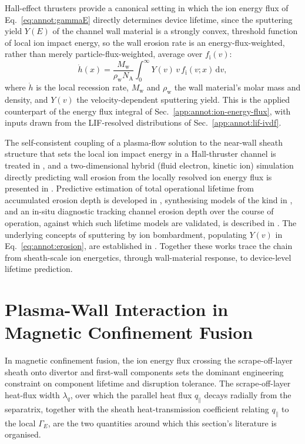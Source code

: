 Hall-effect thrusters provide a canonical setting in which the ion energy flux of Eq.~\eqref{eq:annot:gammaE} directly determines device lifetime, since the sputtering yield $Y(E)$ of the channel wall material is a strongly convex, threshold function of local ion impact energy, so the wall erosion rate is an energy-flux-weighted, rather than merely particle-flux-weighted, average over $f_{\mathrm{i}}(v)$:
\begin{equation}
\dot{h}(x) = \frac{M_{\mathrm{w}}}{\rho_{\mathrm{w}} N_{\mathrm{A}}} \int_{0}^{\infty} Y(v)\, v\, f_{\mathrm{i}}(v;x)\, \mathrm{d}v,
\label{eq:annot:erosion}
\end{equation}
where $\dot{h}$ is the local recession rate, $M_{\mathrm{w}}$ and $\rho_{\mathrm{w}}$ the wall material's molar mass and density, and $Y(v)$ the velocity-dependent sputtering yield. This is the applied counterpart of the energy flux integral of Sec.~\ref{app:annot:ion-energy-flux}, with inputs drawn from the LIF-resolved distributions of Sec.~\ref{app:annot:lif-ivdf}.

The self-consistent coupling of a plasma-flow solution to the near-wall sheath structure that sets the local ion impact energy in a Hall-thruster channel is treated in \cite{ref0425}, and a two-dimensional hybrid (fluid electron, kinetic ion) simulation directly predicting wall erosion from the locally resolved ion energy flux is presented in \cite{ref0433}. Predictive estimation of total operational lifetime from accumulated erosion depth is developed in \cite{ref0440}, synthesising models of the kind in \cite{ref0433}, and an in-situ diagnostic tracking channel erosion depth over the course of operation, against which such lifetime models are validated, is described in \cite{ref0454}. The underlying concepts of sputtering by ion bombardment, populating $Y(v)$ in Eq.~\eqref{eq:annot:erosion}, are established in \cite{ref0143}. Together these works trace the chain from sheath-scale ion energetics, through wall-material response, to device-level lifetime prediction.

\section{Plasma-Wall Interaction in Magnetic Confinement Fusion}
\label{app:annot:fusion-pwi}

In magnetic confinement fusion, the ion energy flux crossing the scrape-off-layer sheath onto divertor and first-wall components sets the dominant engineering constraint on component lifetime and disruption tolerance. The scrape-off-layer heat-flux width $\lambda_{q}$, over which the parallel heat flux $q_{\parallel}$ decays radially from the separatrix, together with the sheath heat-transmission coefficient relating $q_{\parallel}$ to the local $\Gamma_{E}$, are the two quantities around which this section's literature is organised.

